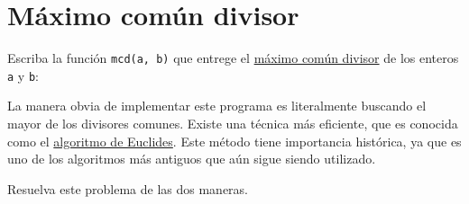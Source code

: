 \section{Máximo común divisor}

Escriba la función \lstinline!mcd(a, b)! que entrege el
\href{http://es.wikipedia.org/wiki/Máximo\_común\_divisor}{máximo común
divisor} de los enteros \lstinline!a! y \lstinline!b!:

La manera obvia de implementar este programa es literalmente buscando el
mayor de los divisores comunes. Existe una técnica más eficiente, que es
conocida como el
\href{http://es.wikipedia.org/wiki/Algoritmo\_de\_Euclides\#Descripci.C3.B3n\_formal}{algoritmo
de Euclides}. Este método tiene importancia histórica, ya que es uno de
los algoritmos más antiguos que aún sigue siendo utilizado.

Resuelva este problema de las dos maneras.
